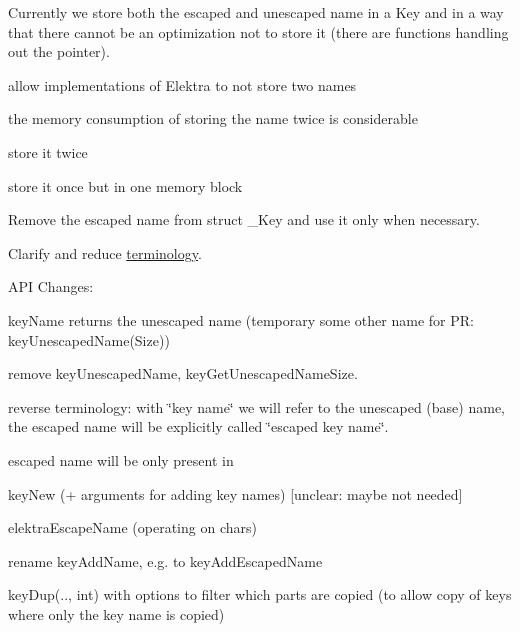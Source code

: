Currently we store both the escaped and unescaped name in a Key and in a way that there cannot be an optimization not to store it (there are functions handling out the pointer).


\begin{DoxyItemize}
\item allow implementations of Elektra to not store two names
\end{DoxyItemize}


\begin{DoxyItemize}
\item the memory consumption of storing the name twice is considerable
\end{DoxyItemize}


\begin{DoxyItemize}
\item store it twice
\item store it once but in one memory block
\end{DoxyItemize}

Remove the escaped name from {\ttfamily struct \+\_\+\+Key} and use it only when necessary.

Clarify and reduce \hyperlink{doc_help_elektra-glossary_md}{terminology}.

A\+PI Changes\+:


\begin{DoxyItemize}
\item {\ttfamily key\+Name} returns the unescaped name (temporary some other name for PR\+: {\ttfamily key\+Unescaped\+Name(\+Size)})
\item remove {\ttfamily key\+Unescaped\+Name}, {\ttfamily key\+Get\+Unescaped\+Name\+Size}.
\item reverse terminology\+: with \char`\"{}key name\char`\"{} we will refer to the unescaped (base) name, the escaped name will be explicitly called \char`\"{}escaped key name\char`\"{}.
\item escaped name will be only present in
\begin{DoxyItemize}
\item {\ttfamily key\+New} (+ arguments for adding key names) \mbox{[}unclear\+: maybe not needed\mbox{]}
\item {\ttfamily elektra\+Escape\+Name} (operating on chars)
\item rename {\ttfamily key\+Add\+Name}, e.\+g. to {\ttfamily key\+Add\+Escaped\+Name}
\end{DoxyItemize}
\item {\ttfamily key\+Dup(.., int)} with options to filter which parts are copied (to allow copy of keys where only the key name is copied)
\end{DoxyItemize}


